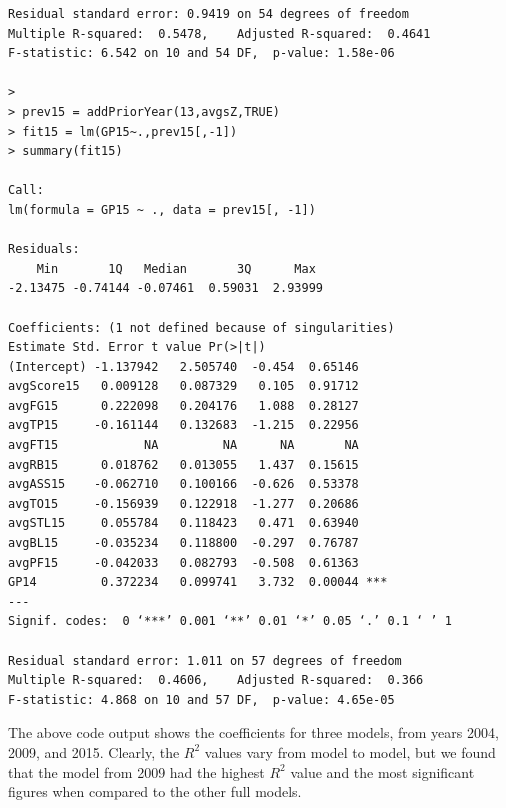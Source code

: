 \documentclass[]{scrartcl}
\begin{document}
\begin{verbatim}
Residual standard error: 0.9419 on 54 degrees of freedom
Multiple R-squared:  0.5478,	Adjusted R-squared:  0.4641 
F-statistic: 6.542 on 10 and 54 DF,  p-value: 1.58e-06

>
> prev15 = addPriorYear(13,avgsZ,TRUE)
> fit15 = lm(GP15~.,prev15[,-1])
> summary(fit15)

Call:
lm(formula = GP15 ~ ., data = prev15[, -1])

Residuals:
    Min       1Q   Median       3Q      Max 
-2.13475 -0.74144 -0.07461  0.59031  2.93999 

Coefficients: (1 not defined because of singularities)
Estimate Std. Error t value Pr(>|t|)    
(Intercept) -1.137942   2.505740  -0.454  0.65146    
avgScore15   0.009128   0.087329   0.105  0.91712    
avgFG15      0.222098   0.204176   1.088  0.28127    
avgTP15     -0.161144   0.132683  -1.215  0.22956    
avgFT15            NA         NA      NA       NA    
avgRB15      0.018762   0.013055   1.437  0.15615    
avgASS15    -0.062710   0.100166  -0.626  0.53378    
avgTO15     -0.156939   0.122918  -1.277  0.20686    
avgSTL15     0.055784   0.118423   0.471  0.63940    
avgBL15     -0.035234   0.118800  -0.297  0.76787    
avgPF15     -0.042033   0.082793  -0.508  0.61363    
GP14         0.372234   0.099741   3.732  0.00044 ***
---
Signif. codes:  0 ‘***’ 0.001 ‘**’ 0.01 ‘*’ 0.05 ‘.’ 0.1 ‘ ’ 1

Residual standard error: 1.011 on 57 degrees of freedom
Multiple R-squared:  0.4606,	Adjusted R-squared:  0.366 
F-statistic: 4.868 on 10 and 57 DF,  p-value: 4.65e-05
\end{verbatim}
\normalsize
The above code output shows the coefficients for three models, from years 2004, 2009, and 2015. Clearly, the $R^{2}$ values vary from model to model, but we found that the model from 2009 had the highest $R^{2}$ value and the most significant figures when compared to the other full models.
\end{document}
